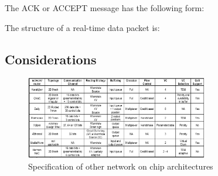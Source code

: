 \documentclass[conference, twocolumn]{IEEEtran}
\theoremstyle{definition}
\begin{document}
The ACK or ACCEPT message has the following form:


\begin{table}[htbp]
\begin{center}
\end{center}
\caption{SETUP path message}
\label{table:PathMsg}
\end{table}


The structure of a real-time data packet is:

\begin{table}[htbp]
\begin{center}
\end{center}
\caption{Real-time data message}
\label{table:DataMsg}
\end{table}

\subsection{Considerations}

\begin{figure}[htp]
\centering
\includegraphics[width=8cm]{pics/OtherArcs.png}
\caption[Other Spec.]
{Specification of other network on chip architectures}\label{fig:otherSpec}
\end{figure}
\end{document}
